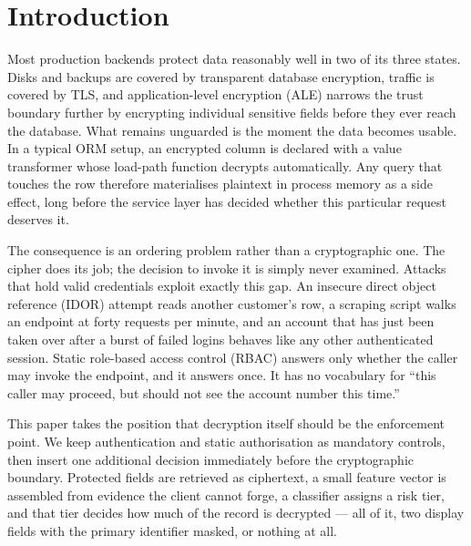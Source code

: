 \documentclass[a4paper,conference]{IEEEtran}
\begin{document}
\section{Introduction}

Most production backends protect data reasonably well in two of its three states. Disks and
backups are covered by transparent database encryption, traffic is covered by TLS, and
application-level encryption (ALE) narrows the trust boundary further by encrypting individual
sensitive fields before they ever reach the database. What remains unguarded is the moment the
data becomes usable. In a typical ORM setup, an encrypted column is declared with a value
transformer whose load-path function decrypts automatically. Any query that touches the row
therefore materialises plaintext in process memory as a side effect, long before the service
layer has decided whether this particular request deserves it.

The consequence is an ordering problem rather than a cryptographic one. The cipher does its
job; the decision to invoke it is simply never examined. Attacks that hold valid credentials
exploit exactly this gap. An insecure direct object reference (IDOR) attempt reads another
customer's row, a scraping script walks an endpoint at forty requests per minute, and an account
that has just been taken over after a burst of failed logins behaves like any other authenticated
session. Static role-based access control (RBAC) answers only whether the caller may invoke the
endpoint, and it answers once. It has no vocabulary for ``this caller may proceed, but should
not see the account number this time.''

This paper takes the position that decryption itself should be the enforcement point. We keep
authentication and static authorisation as mandatory controls, then insert one additional
decision immediately before the cryptographic boundary. Protected fields are retrieved as
ciphertext, a small feature vector is assembled from evidence the client cannot forge, a
classifier assigns a risk tier, and that tier decides how much of the record is decrypted --- all
of it, two display fields with the primary identifier masked, or nothing at all.
\end{document}
